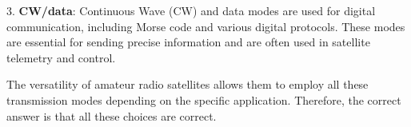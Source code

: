 3. \textbf{CW/data}: Continuous Wave (CW) and data modes are used for digital communication, including Morse code and various digital protocols. These modes are essential for sending precise information and are often used in satellite telemetry and control.

The versatility of amateur radio satellites allows them to employ all these transmission modes depending on the specific application. Therefore, the correct answer is that all these choices are correct.

